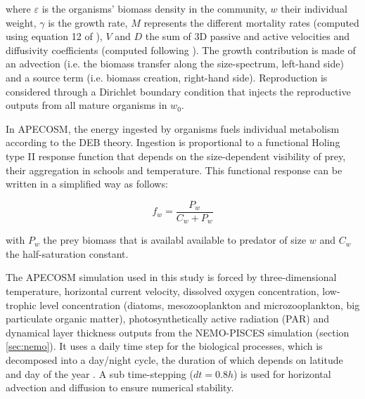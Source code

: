where $\varepsilon$  is the organisms' biomass density in the community, $w$ their individual weight, $\gamma$ is the growth rate, $M$ represents the different mortality rates (computed using equation 12 of \citealt{mauryIndividualsPopulationsCommunities2013}), $V$ and $D$ the sum of 3D passive and active velocities and diffusivity coefficients (computed following \citealt{faugerasAdvectiondiffusionreactionSizestructuredFish2005}). The growth contribution is made of an advection (i.e. the biomass transfer along the size-spectrum, left-hand side) and a source term (i.e. biomass creation, right-hand side). Reproduction is considered through a Dirichlet boundary condition that injects the reproductive outputs from all mature organisms in $w_0$.

In APECOSM, the energy ingested by organisms fuels individual metabolism according to the DEB theory. Ingestion is proportional to a functional Holing type II response function that depends on the size-dependent visibility of prey, their aggregation in schools and temperature. This functional response can be written in a simplified way as follows:

\begin{displaymath}
f_{w} = \frac{P_{w}}{C_{w} + P_{w}}
\end{displaymath}

with $P_{w}$ the prey biomass that is availabl available to predator of size $w$ and $C_{w}$ the half-saturation constant.



The APECOSM simulation used in this study is forced by three-dimensional temperature, horizontal current velocity, dissolved oxygen concentration, low-trophic level concentration (diatoms, mesozooplankton and microzooplankton, big particulate organic matter), photosynthetically active radiation (PAR) and dynamical layer thickness outputs from the NEMO-PISCES simulation (section \ref{sec:nemo}). It uses a daily time step for the biological processes, which is decomposed into a day/night cycle, the duration of which  depends on latitude and day of the year \citep{forsytheModelComparisonDaylength1995}. A sub time-stepping ($dt =0.8h$) is used for horizontal advection and diffusion to ensure numerical stability.

